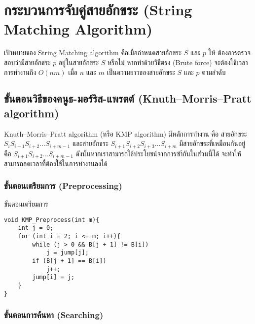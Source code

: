 \chapter{กระบวนการจับคู่สายอักขระ (String Matching Algorithm)}

เป้าหมายของ String Matching algorithm คือเมื่อกำหนดสายอักขระ $S$ และ $p$ ให้ ต้องการตรวจสอบว่ามีสายอักขระ $p$ อยู่ในสายอักขระ $S$ หรือไม่ หากทำด้วยวิธีตรง (Brute force) จะต้องใช้เวลาการทำงานถึง $O(nm)$ เมื่อ $n$ และ $m$ เป็นความยาวของสายอักขระ $S$ และ $p$ ตามลำดับ

\section{ขั้นตอนวิธีของคนูธ-มอร์ริส-แพรตต์ (Knuth–Morris–Pratt algorithm)}

Knuth–Morris–Pratt algorithm (หรือ KMP algorithm) มีหลักการทำงาน คือ สายอักขระ $S_iS_{i+1}S_{i+2}...S_{i+m-1}$ และสายอักขระ $S_{i+1}S_{i+2}S_{i+3}...S_{i+m}$ มีสายอักขระที่เหมือนกันอยู่ คือ $S_{i+1}S_{i+2}...S_{i+m-1}$ ดังนั้นหากเราสามารถใช้ประโยชน์จากการซำ้กันในส่วนนี้ได้ จะทำให้สามารถลดเวลาที่ต้องใช้ในการทำงานลงได้

\subsection{ขั้นตอนเตรียมการ (Preprocessing)}

ขั้นตอนเตรียมการ

\begin{lstlisting}
void KMP_Preprocess(int m){
	int j = 0;
	for (int i = 2; i <= m; i++){
		while (j > 0 && B[j + 1] != B[i])
			j = jump[j];
		if (B[j + 1] == B[i])
			j++;
		jump[i] = j;
	}
}
\end{lstlisting}

\subsection{ขั้นตอนการค้นหา (Searching)}